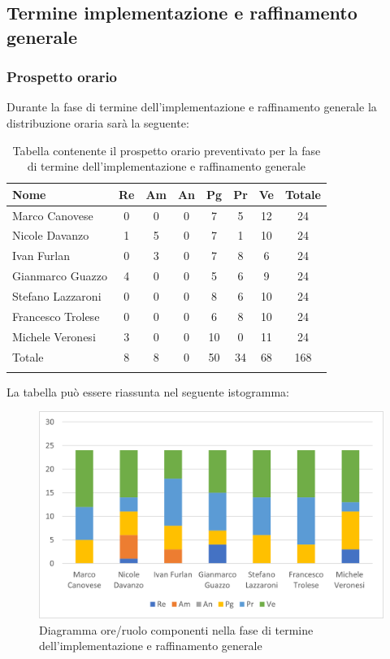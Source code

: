 			\subsection{Termine implementazione e raffinamento generale}
            \subsubsection{Prospetto orario}
			Durante la fase di termine dell'implementazione e raffinamento generale la distribuzione oraria sarà la seguente:
			
			\begin{longtable}{|l|c|c|c|c|c|c|c|}
				\hline
				\rowcolor{lighter-grayer}
				\textbf{Nome} & \textbf{Re} & \textbf{Am} & \textbf{An} & \textbf{Pg}  & \textbf{Pr}   & \textbf{Ve} & \textbf{Totale} \\
				\hline
				\endfirsthead
				
				\hline
				Marco Canovese & 0 & 0 & 0 & 7 & 5 & 12 & 24\\
				\hline
				\hline
				Nicole Davanzo & 1 & 5 & 0 & 7 & 1 & 10 & 24\\
				\hline
				\hline
				Ivan Furlan & 0 & 3 & 0 & 7 & 8 & 6 & 24\\
				\hline
				\hline
				Gianmarco Guazzo & 4 & 0 & 0 & 5 & 6 & 9 & 24\\
				\hline
				\hline
				Stefano Lazzaroni & 0 & 0 & 0 & 8 & 6 & 10 & 24\\
				\hline
				\hline
				Francesco Trolese & 0 & 0 & 0 & 6 & 8 & 10 & 24\\
				\hline
				\hline
				Michele Veronesi & 3 & 0 & 0 & 10 & 0 & 11 & 24\\
				\hline 
				\hline
				Totale & 8 & 8 & 0 & 50 & 34 & 68 & 168\\
				\hline
				\rowcolor{white}
				\caption{Tabella contenente il prospetto orario preventivato per la fase di termine dell'implementazione e raffinamento generale}
			\end{longtable}

		
			La tabella può essere riassunta nel seguente istogramma:
		
			\begin{figure}[H]
				\centering
				\includegraphics[width=0.8\linewidth]{res/images/preventivo/6-1.png}
				\caption{Diagramma ore/ruolo componenti nella fase di termine dell'implementazione e raffinamento generale}
				\label{fig:diagramma suddivisione ruoli fase termine dell'implementazione e raffinamento generale}
			\end{figure}
		
